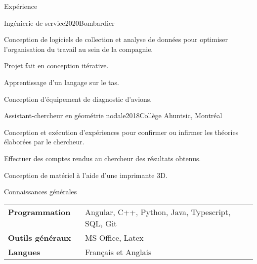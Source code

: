 \documentclass[french,12pt]{resume} %
\begin{document}
	\begin{rSection}{Expérience}
		
		\begin{rSubsection}{Ingénierie de service}{2020}{Bombardier}{}{}
			\item Conception de logiciels de collection et analyse de données pour optimiser l'organisation du travail au sein de la compagnie.
			\item Projet fait en conception itérative. 
			\item Apprentissage d'un langage sur le tas.
			\item Conception d'équipement de diagnostic d'avions.
		\end{rSubsection}
		
		\begin{rSubsection}{Assistant-chercheur en géométrie nodale}{2018}{Collège Ahuntsic, Montréal}{}
			\item 	Conception et exécution d'expériences pour confirmer ou infirmer les théories élaborées par le chercheur.
			\item   Effectuer des comptes rendus au chercheur des résultats obtenus.
			\item   Conception de matériel à l’aide d’une imprimante 3D.
		\end{rSubsection}
		
		
	\end{rSection}
	
	

	
	\begin{rSection}{Connaissances générales}
		
		\begin{tabular}{ @{} >{\bfseries}l @{\hspace{6ex}} l }
			Programmation \              & Angular, C++, Python, Java, Typescript, SQL, Git \\
			Outils généraux                 & MS Office, Latex \\
			Langues & Français et Anglais
		\end{tabular}
		
	\end{rSection}
	
	
\end{document}

